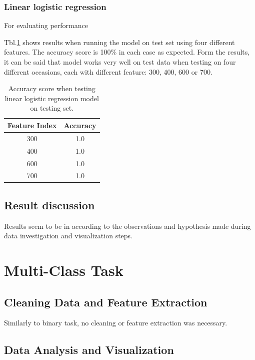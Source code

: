 \documentclass[11pt]{article}
\begin{document}
		\subsubsection{Linear logistic regression}
			For evaluating performance  

			Tbl.\ref{tbl:binary_test_table} shows results when running the model on test set using four different features. The accuracy score is 100\% in each case as expected. Form the results, it can be said that model works very well on test data when testing on four different occasions, each with different feature: 300, 400, 600 or 700.
		\begin{center}
		  	\begin{table}
		  	\centering
			\begin{tabular}[b]{|c | c|}
				 \hline
				 Feature Index 	 & Accuracy \\ 
 				 \hline
				 300 				& 1.0 	\\ 
				 400 				& 1.0 	\\ 
				 600		 		& 1.0 	\\ 
				 700				& 1.0 	\\ 
				 \hline
			\end{tabular}
			\caption{Accuracy score when testing linear logistic regression model on testing set.}
			\label{tbl:binary_test_table}
			\end{table}
		\end{center}
		\vspace*{-1.5cm}

	\subsection{Result discussion}
		Results seem to be in according to the observations and hypothesis made during data investigation and visualization steps. 

	\section{Multi-Class Task}
		\subsection{Cleaning Data and Feature Extraction}
			Similarly to binary task, no cleaning or feature extraction was necessary.

		\subsection{Data Analysis and Visualization}
\end{document}
